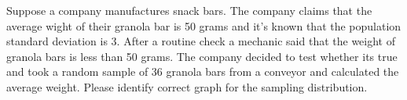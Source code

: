 \documentclass{ximera}
\begin{document}
\begin{example}
Suppose a company manufactures snack bars. The company claims that the average wight of their granola bar is 50 grams and it's known that the population standard deviation is 3. After a routine check a mechanic said that the weight of granola bars is less than 50 grams. The company decided to test whether its true and took a random sample of 36 granola bars from a conveyor and calculated the average weight. Please identify correct graph for the sampling distribution.
\begin{multipleChoice}  
\choice[correct]{}  
\end{multipleChoice}
\end{example}
\end{document}
